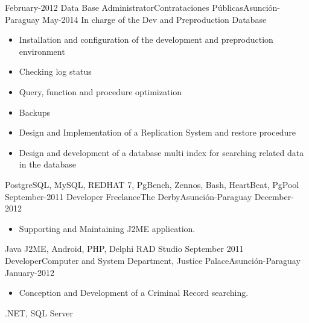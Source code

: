 \begin{experiences}
  \projectexperiences
    {February-2012}   {Data Base Administrator}{Contrataciones Públicas}{Asunción-Paraguay}
    {May-2014} {In charge of the Dev and Preproduction Database}
    {
                      \begin{itemize}
                        \item Installation and configuration of the development  and preproduction environment
                        \item Checking log status
                        \item Query, function and procedure optimization
                        \item Backups
                        \item Design and Implementation of a Replication System and restore procedure
                        \item Design and development of a database multi index for searching related data in the database
                      \end{itemize}
				}
                {PostgreSQL, MySQL, REDHAT 7, PgBench, Zennos, Bash, HeartBeat, PgPool}
  \emptySeparator
  \experience
    {September-2011}   {Developer Freelance}{The Derby}{Asunción-Paraguay}
    {December-2012} {
                      \begin{itemize}
                        \item Supporting and Maintaining J2ME application.
                      \end{itemize}
				}
                {Java J2ME, Android, PHP, Delphi RAD Studio}
  \emptySeparator
  \experience
    {September 2011}   {Developer}{Computer and System Department, Justice Palace}{Asunción-Paraguay}
    {January-2012} {
                      \begin{itemize}
                        \item Conception and Development of a Criminal Record searching.
                      \end{itemize}
				}
                {.NET, SQL Server}
  \emptySeparator
\end{experiences}
